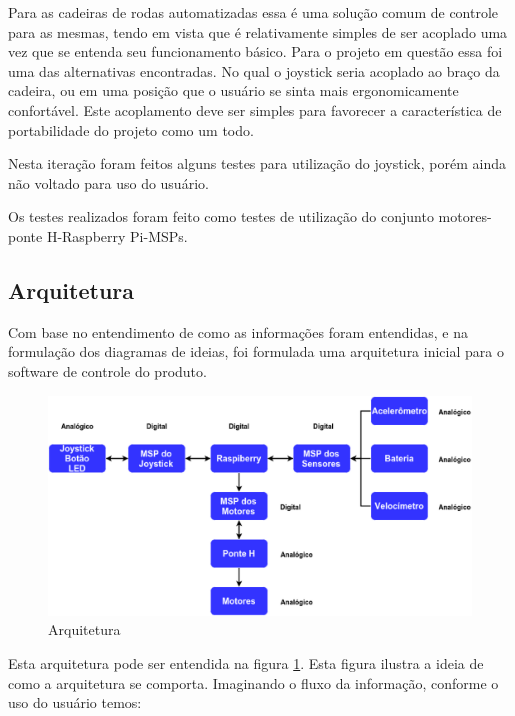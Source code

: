 Para as cadeiras de rodas automatizadas essa é uma solução comum de controle para as mesmas, tendo em vista que é relativamente simples de ser acoplado uma vez que se entenda seu funcionamento básico. Para o projeto em questão essa foi uma das alternativas encontradas. No qual o joystick seria acoplado ao braço da cadeira, ou em uma posição que o usuário se sinta mais ergonomicamente confortável. Este acoplamento deve ser simples para favorecer a característica de portabilidade do projeto como um todo.

Nesta iteração foram feitos alguns testes para utilização do joystick, porém ainda não voltado para uso do usuário.

Os testes realizados foram feito como testes de utilização do conjunto motores-ponte H-Raspberry Pi-MSPs.

\subsection{Arquitetura}

Com base no entendimento de como as informações foram entendidas, e na formulação dos diagramas de ideias, foi formulada uma arquitetura inicial para o software de controle do produto.

\begin{figure}[!htb]
\centering
  \includegraphics[keepaspectratio=true,scale=0.5]{figuras/resultados/arquitetura}
\caption{Arquitetura}
\label{fig:arquitetura}
\end{figure}

Esta arquitetura pode ser entendida na figura \ref{fig:arquitetura}. Esta figura ilustra a ideia de como a arquitetura se comporta. Imaginando o fluxo da informação, conforme o uso do usuário temos:

